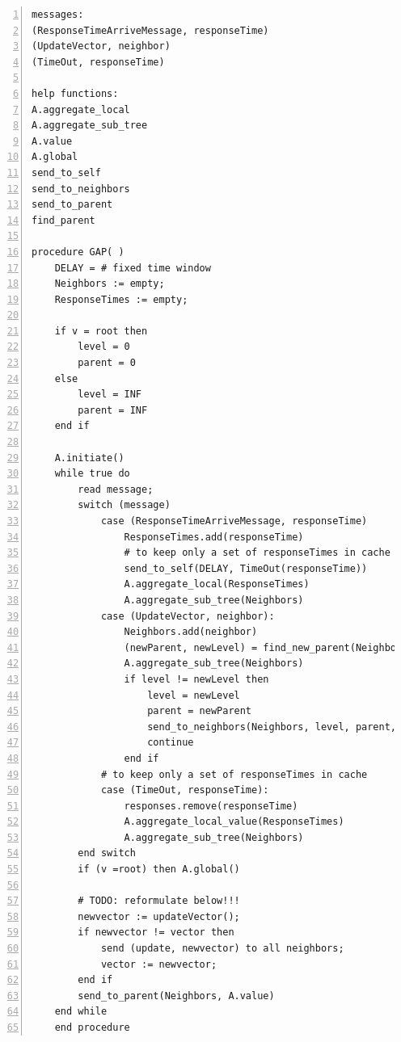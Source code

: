 \documentclass[a4paper, smallheadings,english]{scrartcl}
\begin{document}
\begin{lstlisting}[caption={inspired by \cite{stadler2012protocols}}, numbers=left, frame=single]
messages:
(ResponseTimeArriveMessage, responseTime)
(UpdateVector, neighbor)
(TimeOut, responseTime)

help functions:
A.aggregate_local
A.aggregate_sub_tree
A.value
A.global
send_to_self
send_to_neighbors
send_to_parent
find_parent

procedure GAP( )
    DELAY = # fixed time window
    Neighbors := empty;
    ResponseTimes := empty;

    if v = root then
        level = 0
        parent = 0
    else
        level = INF
        parent = INF
    end if

    A.initiate()
    while true do
        read message;
        switch (message)
            case (ResponseTimeArriveMessage, responseTime)
                ResponseTimes.add(responseTime)
                # to keep only a set of responseTimes in cache
                send_to_self(DELAY, TimeOut(responseTime))
                A.aggregate_local(ResponseTimes)
                A.aggregate_sub_tree(Neighbors)
            case (UpdateVector, neighbor):
                Neighbors.add(neighbor) 
                (newParent, newLevel) = find_new_parent(Neighbors)
                A.aggregate_sub_tree(Neighbors)
                if level != newLevel then
                    level = newLevel
                    parent = newParent
                    send_to_neighbors(Neighbors, level, parent, A.value())
                    continue
                end if
            # to keep only a set of responseTimes in cache
            case (TimeOut, responseTime):
                responses.remove(responseTime)
                A.aggregate_local_value(ResponseTimes)
                A.aggregate_sub_tree(Neighbors)
        end switch
        if (v =root) then A.global()

        # TODO: reformulate below!!!
        newvector := updateVector();
        if newvector != vector then
            send (update, newvector) to all neighbors;
            vector := newvector;
        end if
        send_to_parent(Neighbors, A.value)
    end while
    end procedure
\end{lstlisting}
\end{document}
